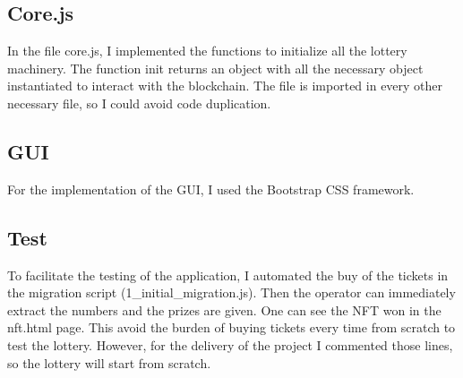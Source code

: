 \documentclass[11pt]{article}
\begin{document}
\subsection{Core.js}
In the file core.js, I implemented the functions to initialize all the lottery machinery.
The function init returns an object with all the necessary object instantiated to interact
with the blockchain. The file is imported in every other necessary file, so I could avoid
code duplication.
\subsection{GUI}
For the implementation of the GUI, I used the Bootstrap CSS framework.
\subsection{Test}
To facilitate the testing of the application, I automated the buy of the tickets in the migration script
(1\_initial\_migration.js). Then the operator can immediately extract the numbers and the prizes are given. One
can see the NFT won in the nft.html page. This avoid the burden of buying tickets
every time from scratch to test the lottery. However, for the delivery of the project
I commented those lines, so the lottery will start from scratch.
\end{document}

